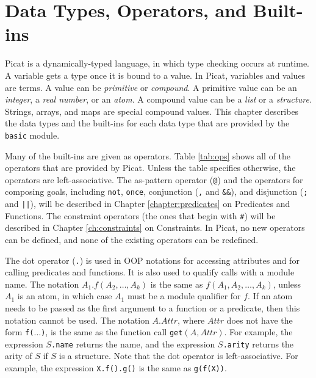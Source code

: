 \chapter{\label{chapter:datatypes}Data Types, Operators, and Built-ins}
Picat is a dynamically-typed language, in which type checking occurs at runtime. A variable gets a type once it is bound to a value. In Picat, variables and values are terms. A value can be \emph{primitive} or \emph{compound}. A primitive value can be an \emph{integer}, a \emph{real number}, or an \emph{atom}. A compound value can be a \emph{list} or a \emph{structure}. Strings, arrays, and maps are special compound values. This chapter describes the data types and the built-ins for each data type that are provided by the \texttt{basic} module. 

Many of the built-ins are given as operators. Table \ref{tab:ops} shows all of the operators that are provided by Picat. Unless the table specifies otherwise, the operators are left-associative.  The as-pattern operator (\verb+@+) and the operators for composing goals, including \texttt{not}, \texttt{once}, conjunction (\verb+,+ and \verb+&&+), and disjunction (\verb+;+ and \verb+||+), will be described in Chapter \ref{chapter:predicates} on Predicates and Functions.  The constraint operators (the ones that begin with \verb+#+) will be described in Chapter \ref{ch:constraints} on Constraints. In Picat, no new operators can be defined, and none of the existing operators can be redefined.

The dot operator (\verb+.+) is used in OOP notations for accessing attributes and for calling predicates and functions. It is also used to qualify calls with a module name. The notation \texttt{$A_1.f(A_2,\ldots,A_k)$} is the same as \texttt{$f(A_1,A_2,\ldots,A_k)$}, unless $A_1$ is an atom, in which case $A_1$ must be a module qualifier for $f$.  If an atom needs to be passed as the first argument to a function or a predicate, then this notation cannot be used. The notation $A.Attr$, where $Attr$ does not have the form \texttt{f($\ldots$)}, is the same as the function call \texttt{get$(A,Attr)$}. For example, the expression \texttt{$S$.name} returns the name, and the expression \texttt{$S$.arity} returns the arity of $S$ if $S$ is a structure.   Note that the dot operator is left-associative.  For example, the expression \texttt{X.f().g()} is the same as \texttt{g(f(X))}.

